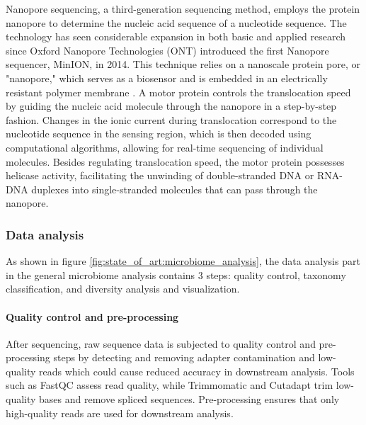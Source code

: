         Nanopore sequencing, a third-generation sequencing method, employs the protein nanopore to determine the nucleic acid sequence of a nucleotide sequence. The technology has seen considerable expansion in both basic and applied research since Oxford Nanopore Technologies (ONT) introduced the first Nanopore sequencer, MinION, in 2014. This technique relies on a nanoscale protein pore, or "nanopore," which serves as a biosensor and is embedded in an electrically resistant polymer membrane \cite{wang2021nanopore}. A motor protein controls the translocation speed by guiding the nucleic acid molecule through the nanopore in a step-by-step fashion. Changes in the ionic current during translocation correspond to the nucleotide sequence in the sensing region, which is then decoded using computational algorithms, allowing for real-time sequencing of individual molecules. Besides regulating translocation speed, the motor protein possesses helicase activity, facilitating the unwinding of double-stranded DNA or RNA-DNA duplexes into single-stranded molecules that can pass through the nanopore.


        \subsubsection{Data analysis}
            As shown in figure \ref{fig:state_of_art:microbiome_analysis}, the data analysis part in the general microbiome analysis contains 3 steps: quality control, taxonomy classification, and diversity analysis and visualization.
            
        \paragraph*{Quality control and pre-processing}
        After sequencing, raw sequence data is subjected to quality control and pre-processing steps by detecting and removing adapter contamination and low-quality reads which could cause reduced accuracy in downstream analysis. Tools such as FastQC \cite{andrews2010fastqc} assess read quality, while Trimmomatic \cite{bolger2014trimmomatic} and Cutadapt \cite{martin2011cutadapt} trim low-quality bases and remove spliced sequences. Pre-processing ensures that only high-quality reads are used for downstream analysis.
        
